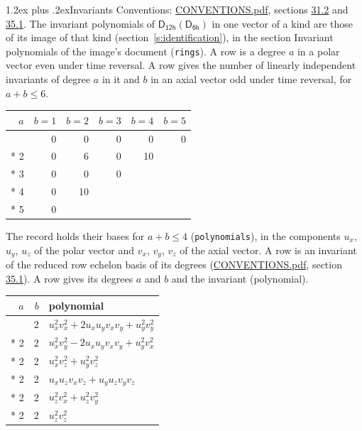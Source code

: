 \documentclass[10pt,a4paper]{article}
\makeatletter
\renewcommand\section{\@startsection{section}{1}{\z@}{-3ex plus -1ex minus -.2ex}%
  {1.2ex plus .2ex}{\normalfont\large\sffamily\bfseries\color{parttitle}}}
\numberwithin{equation}{section}
\newcommand{\grp}[1]{\mathsf{#1}}
\makeatother
\begin{document}
\section{Invariants}\label{s:invariants}
Conventions: \href{../../CONVENTIONS.pdf}{CONVENTIONS.pdf}, sections \href{../../CONVENTIONS.pdf\#conv.31.2}{31.2} and \href{../../CONVENTIONS.pdf\#conv.35.1}{35.1}.
The invariant polynomials of $\grp{D_{12h}}(\grp{D_{6h}})$ in one vector of a kind are those of its image of that kind (section~\ref{s:identification}), in the section Invariant polynomials of the image's document (\texttt{rings}).
\leavevmode\label{n:index.degree.polar}\label{n:index.degree.axial}A row is a degree $a$ in a polar vector even under time reversal. A row gives the number of linearly independent invariants of degree $a$ in it and $b$ in an axial vector odd under time reversal, for $a + b \le 6$.
{\small\begin{longtable}{@{}rrrrrr@{}}\toprule
$a$ & $b = 1$ & $b = 2$ & $b = 3$ & $b = 4$ & $b = 5$\\\midrule\endhead
\bottomrule\endfoot\endlastfoot
1 & 0 & 0 & 0 & 0 & 0\\*
2 & 0 & 6 & 0 & 10 & \\*
3 & 0 & 0 & 0 &  & \\*
4 & 0 & 10 &  &  & \\*
5 & 0 &  &  &  & \\
\bottomrule\end{longtable}}
\leavevmode\label{n:local.component.polar}\label{n:local.component.axial}The record holds their bases for $a + b \le 4$ (\texttt{polynomials}), in the components $u_{x}$, $u_{y}$, $u_{z}$ of the polar vector and $v_{x}$, $v_{y}$, $v_{z}$ of the axial vector. \label{n:head.polynomial}A row is an invariant of the reduced row echelon basis of its degrees (\href{../../CONVENTIONS.pdf}{CONVENTIONS.pdf}, section \href{../../CONVENTIONS.pdf\#conv.35.1}{35.1}). A row gives its degrees $a$ and $b$ and the invariant (polynomial).
{\small\renewcommand{\arraystretch}{1.2}\begin{longtable}{@{}rrl@{}}\toprule
$a$ & $b$ & polynomial\\\midrule\endhead
\bottomrule\endfoot\endlastfoot
2 & 2 & $u_{x}^{2}v_{x}^{2} + 2u_{x}u_{y}v_{x}v_{y} + u_{y}^{2}v_{y}^{2}$\\*
2 & 2 & $u_{x}^{2}v_{y}^{2} - 2u_{x}u_{y}v_{x}v_{y} + u_{y}^{2}v_{x}^{2}$\\*
2 & 2 & $u_{x}^{2}v_{z}^{2} + u_{y}^{2}v_{z}^{2}$\\*
2 & 2 & $u_{x}u_{z}v_{x}v_{z} + u_{y}u_{z}v_{y}v_{z}$\\*
2 & 2 & $u_{z}^{2}v_{x}^{2} + u_{z}^{2}v_{y}^{2}$\\*
2 & 2 & $u_{z}^{2}v_{z}^{2}$\\
\bottomrule\end{longtable}}
\end{document}
